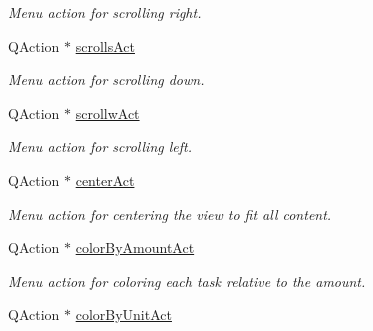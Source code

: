 \begin{DoxyCompactItemize}
\begin{DoxyCompactList}\small\item\em Menu action for scrolling right. \end{DoxyCompactList}\item 
\hypertarget{class_main_window_a37ed37186143d9eb86245d6d9f16825a}{}Q\+Action $\ast$ \hyperlink{class_main_window_a37ed37186143d9eb86245d6d9f16825a}{scrolls\+Act}\label{class_main_window_a37ed37186143d9eb86245d6d9f16825a}

\begin{DoxyCompactList}\small\item\em Menu action for scrolling down. \end{DoxyCompactList}\item 
\hypertarget{class_main_window_a81c6b5894367519bb960dc41a7cac94c}{}Q\+Action $\ast$ \hyperlink{class_main_window_a81c6b5894367519bb960dc41a7cac94c}{scrollw\+Act}\label{class_main_window_a81c6b5894367519bb960dc41a7cac94c}

\begin{DoxyCompactList}\small\item\em Menu action for scrolling left. \end{DoxyCompactList}\item 
\hypertarget{class_main_window_ae683117a63a4704c29c145ec43fd8cd2}{}Q\+Action $\ast$ \hyperlink{class_main_window_ae683117a63a4704c29c145ec43fd8cd2}{center\+Act}\label{class_main_window_ae683117a63a4704c29c145ec43fd8cd2}

\begin{DoxyCompactList}\small\item\em Menu action for centering the view to fit all content. \end{DoxyCompactList}\item 
\hypertarget{class_main_window_a974454751eb8589532a62d8f0ce4d148}{}Q\+Action $\ast$ \hyperlink{class_main_window_a974454751eb8589532a62d8f0ce4d148}{color\+By\+Amount\+Act}\label{class_main_window_a974454751eb8589532a62d8f0ce4d148}

\begin{DoxyCompactList}\small\item\em Menu action for coloring each task relative to the amount. \end{DoxyCompactList}\item 
\hypertarget{class_main_window_a88cf5f2b7bc25dece22dad7c02c13eab}{}Q\+Action $\ast$ \hyperlink{class_main_window_a88cf5f2b7bc25dece22dad7c02c13eab}{color\+By\+Unit\+Act}\label{class_main_window_a88cf5f2b7bc25dece22dad7c02c13eab}


\end{DoxyCompactItemize}
